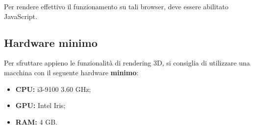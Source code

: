 Per rendere effettivo il funzionamento su tali browser, deve essere abilitato JavaScript.

\subsection{Hardware minimo}
Per sfruttare appieno le funzionalità di rendering 3D, si consiglia di utilizzare una macchina con il seguente hardware \textbf{minimo}:
\begin{itemize}
    \item \textbf{CPU:} i3-9100 3.60 GHz;
    \item \textbf{GPU:} Intel Iris;
    \item \textbf{RAM:} 4 GB.
\end{itemize}
